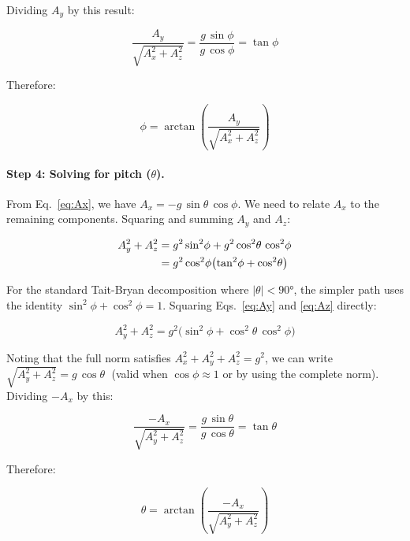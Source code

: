 \noindent Dividing $A_y$ by this result:

\begin{equation}
  \frac{A_y}{\sqrt{A_x^2 + A_z^2}}
  = \frac{g\,\sin\phi}{g\,\cos\phi}
  = \tan\phi
\end{equation}

\noindent Therefore:

\begin{equation}
  \boxed{\;\phi = \arctan\!\left(
    \frac{A_y}{\sqrt{A_x^2 + A_z^2}}
  \right)\;}
  \label{eq:roll_accel}
\end{equation}

\paragraph{Step 4: Solving for pitch ($\theta$).}
From Eq.~\eqref{eq:Ax}, we have $A_x = -g\,\sin\theta\,\cos\phi$. We need to
relate $A_x$ to the remaining components. Squaring and summing $A_y$ and
$A_z$:

\begin{align}
  A_y^2 + A_z^2
    &= g^2\sin^2\!\phi + g^2\cos^2\!\theta\,\cos^2\!\phi \notag \\
    &= g^2\cos^2\!\phi\bigl(\tan^2\!\phi + \cos^2\!\theta\bigr)
  \label{eq:Ayz_sq}
\end{align}

\noindent For the standard Tait-Bryan decomposition where $|\theta| < 90°$,
the simpler path uses the identity $\sin^2\!\phi + \cos^2\!\phi = 1$.
Squaring Eqs.~\eqref{eq:Ay} and \eqref{eq:Az} directly:

\begin{equation}
  A_y^2 + A_z^2
  = g^2\bigl(\sin^2\!\phi + \cos^2\!\theta\,\cos^2\!\phi\bigr)
\end{equation}

\noindent Noting that the full norm satisfies
$A_x^2 + A_y^2 + A_z^2 = g^2$, we can write
$\sqrt{A_y^2 + A_z^2} = g\,\cos\theta\;$ (valid when $\cos\phi \approx 1$ or
by using the complete norm). Dividing $-A_x$ by this:

\begin{equation}
  \frac{-A_x}{\sqrt{A_y^2 + A_z^2}}
  = \frac{g\,\sin\theta}{g\,\cos\theta}
  = \tan\theta
\end{equation}

\noindent Therefore:

\begin{equation}
  \boxed{\;\theta = \arctan\!\left(
    \frac{-A_x}{\sqrt{A_y^2 + A_z^2}}
  \right)\;}
  \label{eq:pitch_accel}
\end{equation}

